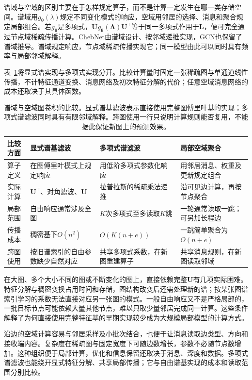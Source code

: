 谱域与空域的区别主要在于怎样规定算子，而不是计算一定发生在哪一类存储空间。谱域用$g_{\bm{\theta}}(\lambda)$规定不同变化模式的响应，空域用邻居的选择、消息和聚合规定局部组合。若$g_{\bm{\theta}}$是多项式，$\bm{U}g_{\bm{\theta}}(\bm{\Lambda})\bm{U}^{\top}$等于同一多项式作用于$\bm{L}$，便可完全通过节点域稀疏传播计算。ChebNet由谱域设计、按邻域递推实现，GCN也保留了谱域推导。谱域规定响应，节点域稀疏传播实现它；同一模型由此可以同时具有频率与局部邻域解释。

表~\ref{tab:gnn-spectral-spatial}将显式谱实现与多项式实现分开。比较计算量时固定一张稀疏图与单通道线性传播，不计特征通道变换、消息网络及初次特征分解的代价；任意空域消息网络的成本还取决于其具体函数。
\begin{table}[htb]
  \centering
  \small
  \begin{tabularx}{\linewidth}{@{}p{17mm}XXX@{}}
    \toprule
    比较方面 & 显式谱基滤波 & 多项式谱滤波 & 局部空域聚合\\
    \midrule
    算子定义 & 在图傅里叶模式上规定响应 & 用低阶多项式参数化响应 & 用邻居消息、权重及更新规定组合\\
    实际计算 & $\bm{U}^{\top}$、对角滤波、$\bm{U}$ & 拉普拉斯的稀疏乘法递推 & 沿可见边计算，再按节点聚合\\
    局部范围 & 自由响应通常涉及全图 & $K$次多项式至多读取$K$跳 & 一轮通常读取一跳；可另加长程边\\
    传播成本 & 稠密基下$O(n^2)$ & $O(K(n+e))$ & 一跳简单聚合为$O(n+e)$\\
    跨图使用 & 按旧谱索引的自由参数缺少自然对应 & 共享多项式系数，在新图重建算子 & 共享消息规则，在新图读取邻域\\
    \bottomrule
  \end{tabularx}
  \caption{谱域与空域图卷积的比较。显式谱基滤波表示直接使用完整图傅里叶基的实现；多项式谱滤波同时具有有限邻域解释。跨图使用一行只说明计算规则能否复用，不能据此保证新图上的预测效果。}
  \label{tab:gnn-spectral-spatial}
\end{table}
\FloatBarrier

在大图、多个大小不同的图或不断变化的图上，直接依赖完整$\bm{U}$有几项实际困难。特征分解与稠密变换占用时间和存储，图结构改变后还需处理新的谱；按某张图谱索引学习的系数无法直接对应另一张图的模式。一般自由响应又不是严格局部的，一批目标节点可能依赖大量其他节点，难以只取少量邻居完成同一计算。这些条件解释了为何直接使用完整特征基的早期实现较少成为大规模局部模型的计算方式。

沿边的空域计算容易与邻居采样及小批次结合，也便于让消息读取边类型、方向和接收端内容。复杂度在稀疏图与固定宽度下可随边数增长，参数不必随节点数增加。这种组织便于局部计算，优化和信息保留还取决于消息、深度和数据。多项式谱滤波也能绕开显式特征分解、共享局部传播；它与自由谱基实现的成本和读取范围分别比较。

